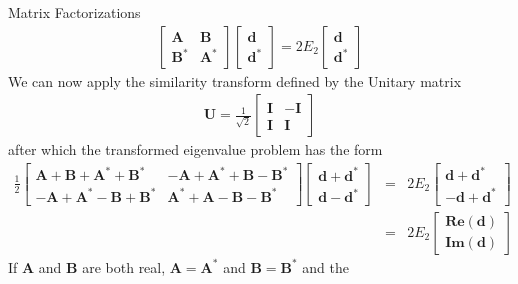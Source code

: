 \documentclass[10pt]{beamer}
\begin{document}
{{{{{{{{{{{{{{{{\begin{frame}{Matrix Factorizations}
  \vspace{-6mm}
  \begin{eqnarray*}
    \begin{bmatrix}
      \mathbf{A} & \mathbf{B} \\
      \mathbf{B^*} & \mathbf{A^*} 
    \end{bmatrix}
    \begin{bmatrix}
      \mathbf{d} \\
      \mathbf{d^*} 
    \end{bmatrix}
    = 2E_2
    \begin{bmatrix}
      \mathbf{d} \\
      \mathbf{d^*} 
    \end{bmatrix}
  \end{eqnarray*}
  We can now apply the similarity transform defined by the Unitary matrix 
  \begin{eqnarray*}
    \mathbf{U} = \frac{1}{\sqrt{2}}
    \begin{bmatrix}
      \mathbf{I} & -\mathbf{I} \\
      \mathbf{I} & \mathbf{I} 
    \end{bmatrix}
  \end{eqnarray*}
  after which the transformed eigenvalue problem has the form
  \begin{eqnarray*}
    \frac{1}{2}
    \begin{bmatrix}
      \mathbf{A + B + A^* + B^*} & \mathbf{-A + A^* + B - B^*} \\
      \mathbf{-A + A^* - B + B^*} & \mathbf{A^* + A - B - B^*} 
    \end{bmatrix}
    \begin{bmatrix}
      \mathbf{d + d^*} \\
      \mathbf{d - d^*} 
    \end{bmatrix}
    &=& 2E_2
    \begin{bmatrix}
      \mathbf{d + d^*} \\
      \mathbf{-d + d^*} 
    \end{bmatrix} \\
    &=& 2E_2
    \begin{bmatrix}
      \mathbf{Re(d)} \\
      \mathbf{Im(d)} 
    \end{bmatrix}
  \end{eqnarray*}
  If $\mathbf{A}$ and $\mathbf{B}$ are both real, $\mathbf{A = A^*}$ and $\mathbf{B = B^*}$ and the 

\end{frame}}}}}}}}}}}}}}}}}
\end{document}

